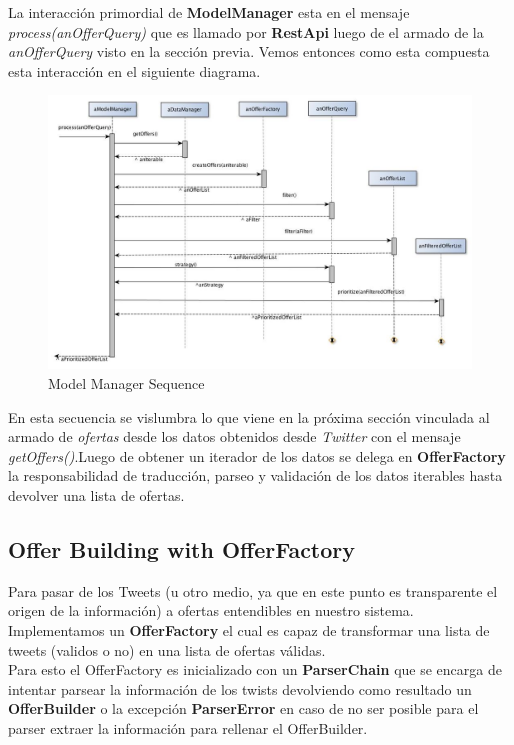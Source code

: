 \documentclass[10pt, a4paper]{article}
\begin{document}
La interacci\'on primordial de \textbf{ModelManager} esta en el mensaje \emph{process(anOfferQuery)} que es llamado por \textbf{RestApi} luego de el armado de la \emph{anOfferQuery} visto en la secci\'on previa. Vemos entonces como esta compuesta esta interacci\'on en el siguiente diagrama. 

\begin{figure}[H]
\centering
\includegraphics[scale=0.50]{graphics/modelManager_sequence.jpg}
\caption{Model Manager Sequence}
\end{figure}

En esta secuencia se vislumbra lo que viene en la pr\'oxima secci\'on vinculada al armado de \emph{ofertas} desde los datos obtenidos desde \emph{Twitter} con el mensaje \emph{getOffers()}.Luego de obtener un iterador de los datos se delega en \textbf{OfferFactory} la responsabilidad de traducci\'on, parseo y validaci\'on de los datos iterables hasta devolver una lista de ofertas.

\newpage
\subsection{Offer Building with OfferFactory}

Para pasar de los Tweets (u otro medio, ya que en este punto es transparente el origen de la información) a ofertas entendibles en nuestro sistema. Implementamos un \textbf{OfferFactory} el cual es capaz de transformar una lista de tweets (validos o no) en una lista de ofertas válidas.\\

Para esto el OfferFactory es inicializado con un \textbf{ParserChain} que se encarga de intentar parsear la información de los twists devolviendo como resultado un \textbf{OfferBuilder} o la excepción  \textbf{ParserError} en caso de no ser posible para el parser extraer la información para rellenar el OfferBuilder.\\
\end{document}
